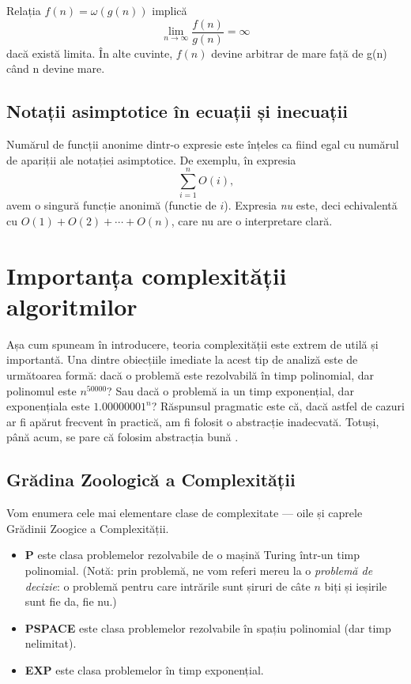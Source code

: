 \documentclass{article}
\begin{document}
Relația $f(n) = \omega(g(n))$ implică
\begin{equation*}
	\lim_{n \to \infty} \frac{f(n)}{g(n)} = \infty
\end{equation*}
dacă există limita. În alte cuvinte, $f(n)$ devine arbitrar de mare față de g(n)
când n devine mare.


\subsection{Notații asimptotice în ecuații și inecuații}
Numărul de funcții anonime dintr-o expresie este înțeles ca fiind egal cu
numărul de apariții ale notației asimptotice. De exemplu, în expresia
\begin{equation*}
	\sum_{i = 1}^{n} O(i) \text{,}
\end{equation*}
avem o singură funcție anonimă (functie de $i$). Expresia \emph{nu} este,
deci echivalentă cu $O(1) + O(2) + \cdots + O(n)$, care nu are o interpretare
clară.

\section{Importanța complexității algoritmilor}
Așa cum spuneam în introducere, teoria complexității este extrem de utilă și
importantă. Una dintre obiecțiile imediate la acest tip de analiză este de
următoarea formă: dacă o problemă este rezolvabilă în timp polinomial, dar
polinomul este $n^{50000}$? Sau dacă o problemă ia un timp exponențial, dar
exponențiala este $1.00000001^n$? Răspunsul pragmatic este că, dacă astfel de
cazuri ar fi apărut frecvent în practică, am fi folosit o abstracție inadecvată.
Totuși, până acum, se pare că folosim abstracția bună \cite{qcsd}.

\subsection{Grădina Zoologică a Complexității}
Vom enumera cele mai elementare clase de complexitate --- oile și caprele
Grădinii Zoogice a Complexității.
\begin{itemize}
	\item \textbf{P} este clasa problemelor rezolvabile de o mașină Turing
	      într-un timp polinomial. (Notă: prin \glqq problemă\grqq, ne vom referi
	      mereu la o \emph{problemă de decizie}: o problemă pentru care intrările sunt
	      șiruri de câte $n$ biți și ieșirile sunt fie \glqq da\grqq, fie \glqq
	      nu\grqq.)
	\item \textbf{PSPACE} este clasa problemelor rezolvabile în spațiu polinomial
	      (dar timp nelimitat).
	\item \textbf{EXP} este clasa problemelor în timp exponențial.
\end{itemize}
\end{document}

